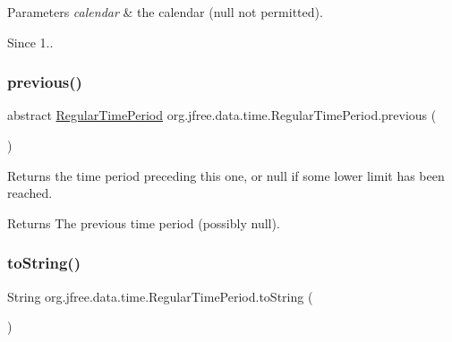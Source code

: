 \begin{DoxyParams}{Parameters}
{\em calendar} & the calendar ({\ttfamily null} not permitted).\\
\hline
\end{DoxyParams}
\begin{DoxySince}{Since}
1.. 
\end{DoxySince}
\mbox{\label{classorg_1_1jfree_1_1data_1_1time_1_1_regular_time_period_a1726057d88322b2f9eebf9d4ec46efab}} 
\subsubsection{\texorpdfstring{previous()}{previous()}}
{\footnotesize\ttfamily abstract \mbox{\hyperlink{classorg_1_1jfree_1_1data_1_1time_1_1_regular_time_period}{Regular\+Time\+Period}} org.\+jfree.\+data.\+time.\+Regular\+Time\+Period.\+previous (\begin{DoxyParamCaption}{ }\end{DoxyParamCaption})\hspace{0.3cm}{\ttfamily [abstract]}}

Returns the time period preceding this one, or {\ttfamily null} if some lower limit has been reached.

\begin{DoxyReturn}{Returns}
The previous time period (possibly {\ttfamily null}). 
\end{DoxyReturn}
\mbox{\label{classorg_1_1jfree_1_1data_1_1time_1_1_regular_time_period_a7725caa0de2ab5baaba9a93d4f3123f9}} 
\subsubsection{\texorpdfstring{to\+String()}{toString()}}
{\footnotesize\ttfamily String org.\+jfree.\+data.\+time.\+Regular\+Time\+Period.\+to\+String (\begin{DoxyParamCaption}{ }\end{DoxyParamCaption})}

